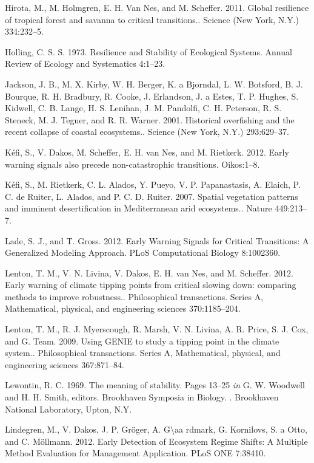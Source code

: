 \documentclass{article}
\begin{document}
Hirota, M., M. Holmgren, E. H. Van Nes, and M. Scheffer. 2011. Global
resilience of tropical forest and savanna to critical transitions..
Science (New York, N.Y.) 334:232--5.

Holling, C. S. S. 1973. Resilience and Stability of Ecological Systems.
Annual Review of Ecology and Systematics 4:1--23.

Jackson, J. B., M. X. Kirby, W. H. Berger, K. a Bjorndal, L. W.
Botsford, B. J. Bourque, R. H. Bradbury, R. Cooke, J. Erlandson, J. a
Estes, T. P. Hughes, S. Kidwell, C. B. Lange, H. S. Lenihan, J. M.
Pandolfi, C. H. Peterson, R. S. Steneck, M. J. Tegner, and R. R. Warner.
2001. Historical overfishing and the recent collapse of coastal
ecosystems.. Science (New York, N.Y.) 293:629--37.

Kéfi, S., V. Dakos, M. Scheffer, E. H. van Nes, and M. Rietkerk. 2012.
Early warning signals also precede non-catastrophic transitions.
Oikos:1--8.

Kéfi, S., M. Rietkerk, C. L. Alados, Y. Pueyo, V. P. Papanastasis, A.
Elaich, P. C. de Ruiter, L. Alados, and P. C. D. Ruiter. 2007. Spatial
vegetation patterns and imminent desertification in Mediterranean arid
ecosystems.. Nature 449:213--7.

Lade, S. J., and T. Gross. 2012. Early Warning Signals for Critical
Transitions: A Generalized Modeling Approach. PLoS Computational Biology
8:1002360.

Lenton, T. M., V. N. Livina, V. Dakos, E. H. van Nes, and M. Scheffer.
2012. Early warning of climate tipping points from critical slowing
down: comparing methods to improve robustness.. Philosophical
transactions. Series A, Mathematical, physical, and engineering sciences
370:1185--204.

Lenton, T. M., R. J. Myerscough, R. Marsh, V. N. Livina, A. R. Price, S.
J. Cox, and G. Team. 2009. Using GENIE to study a tipping point in the
climate system.. Philosophical transactions. Series A, Mathematical,
physical, and engineering sciences 367:871--84.

Lewontin, R. C. 1969. The meaning of stability. Pages 13--25 \emph{in}
G. W. Woodwell and H. H. Smith, editors. Brookhaven Symposia in Biology.
. Brookhaven National Laboratory, Upton, N.Y.

Lindegren, M., V. Dakos, J. P. Gröger, A. G\textbackslash{}aa rdmark, G.
Kornilovs, S. a Otto, and C. Möllmann. 2012. Early Detection of
Ecosystem Regime Shifts: A Multiple Method Evaluation for Management
Application. PLoS ONE 7:38410.
\end{document}
